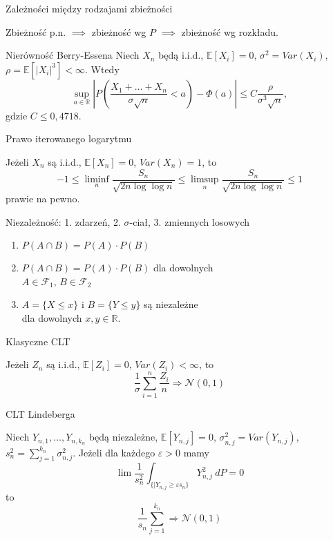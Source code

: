 \documentclass[avery5371,grid,frame]{flashcards}
\begin{document}
\begin{flashcard}[Twierdzenie]{Zależności między rodzajami zbieżności}

\smallskip
Zbieżność p.n. $\implies$ zbieżność wg $P$ $\implies$ zbieżność wg rozkładu.
\end{flashcard}

\begin{flashcard}[Twierdzenie]{Nierówność Berry-Essena}
	\smallskip
	Niech $X_n$ będą i.i.d., $\mathbb{E}[X_i] = 0$, $\sigma^2 = Var(X_i)$, $\rho = \mathbb{E}[|X_i|^3] < \infty$. Wtedy
	$$ \sup_{a \in \mathbb{R}} \left | P\left(\frac{X_1 + \dots + X_n}{\sigma \sqrt{n}} < a \right ) - \Phi(a) \right | \leq C \frac{\rho}{\sigma^3 \sqrt{n}},$$ gdzie $C \leq 0,4718$.
\end{flashcard}

\begin{flashcard}[Twierdzenie]{Prawo iterowanego logarytmu}

\smallskip
Jeżeli $X_n$ są i.i.d., $\mathbb{E}[X_n] = 0$, $Var(X_n) = 1$, to
$$ -1 \leq \liminf_n \frac{S_n}{\sqrt{2n \log \log n}} \leq  \limsup_n \frac{S_n}{\sqrt{2n \log \log n}} \leq 1$$ prawie na pewno.
\end{flashcard}

\begin{flashcard}[Definicja]{Niezależność: 1. zdarzeń, 2. $\sigma$-ciał, 3. zmiennych losowych}

\smallskip
\begin{enumerate}
	\item $P(A \cap B) = P(A) \cdot P(B)$
	\item $P(A \cap B) = P(A) \cdot P(B)$ dla dowolnych \\
	$A \in \mathcal{F}_1$, $B \in \mathcal{F}_2$
	\item $A = \{X \leq x\}$ i $B = \{Y \leq y\}$ są niezależne \\ 
	dla dowolnych $x, y \in \mathbb{R}$.
\end{enumerate}
\end{flashcard}

\begin{flashcard}[Twierdzenie]{Klasyczne CLT}

\smallskip
Jeżeli $Z_n$ są i.i.d., $\mathbb{E}[Z_i] = 0$, $Var(Z_i) < \infty$, to $$\frac{1}{\sigma} \sum_{i=1}^n \frac{Z_i}{n} \Rightarrow \mathcal{N}(0, 1)$$
\end{flashcard}

\begin{flashcard}[Twierdzenie]{CLT Lindeberga}

\smallskip
Niech $Y_{n, 1}, \dots, Y_{n, k_n}$ będą niezależne, $\mathbb{E}[Y_{n, j}] = 0$, $\sigma_{n, j}^2 = Var(Y_{n, j})$, $s_n^2 = \sum_{j = 1}^{k_n} \sigma_{n, j}^2$. Jeżeli dla każdego $\varepsilon > 0$ mamy
$$\lim \frac{1}{s_n^2} \int_{\{|Y_{n, j} \geq \varepsilon s_n\}} Y_{n, j}^2 \ dP = 0$$
to
$$ \frac{1}{s_n} \sum_{j = 1}^{k_n} \Rightarrow \mathcal{N}(0, 1)$$
\end{flashcard}
\end{document}
